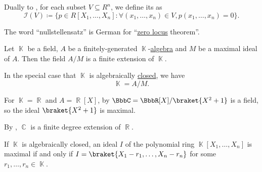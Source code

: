 \begin{definition}\label{def:ideal_of_affine_variety}
  Dually to , for each subset \( V \subseteq R^n \), we define its  as
  \begin{equation*}
    \mathcal{I}(V) \coloneqq \{ p \in R[X_1, \ldots, X_n] \colon \forall (x_1, \ldots, x_n) \in V, p(x_1, \ldots, x_n) = 0 \}.
  \end{equation*}
\end{definition}

\begin{remark}\label{rem:nullstelletsatz_etymology}
  The word \enquote{nullstellensatz} is German for \enquote{\hyperref[def:zero_locus]{zero locus} theorem}.
\end{remark}

\begin{theorem}\label{thm:algebraic_nullstellensatz}
  Let \( \BbbK \) be a field, \( A \) be a finitely-generated \( \BbbK \)-\hyperref[def:algebra_over_ring]{algebra} and \( M \) be a maximal ideal of \( A \). Then the field \( A / M \) is a finite extension of \( \BbbK \).

  In the special case that \( \BbbK \) is algebraically \hyperref[def:algebraically_closed_field]{closed}, we have
  \begin{equation*}
    \BbbK = A / M.
  \end{equation*}
\end{theorem}

\begin{example}\label{ex:algebraic_nullstellensatz_real_over_complex}
  For \( \BbbK = \BbbR \) and \( A = \BbbR[X] \), by  \( \BbbC = \BbbR[X] / \braket{X^2 + 1} \) is a field, so the ideal \( \braket{X^2 + 1} \) is maximal.

  By , \( \BbbC \) is a finite degree extension of \( \BbbR \).
\end{example}

\begin{corollary}\label{thm:closed_field_maximal_ideal_representation}
  If \( \BbbK \) is algebraically closed, an ideal \( I \) of the polynomial ring \( \BbbK[X_1, \ldots, X_n] \) is maximal if and only if \( I = \braket{X_1 - r_1, \ldots, X_n - r_n} \) for some \( r_1, \ldots, r_n \in \BbbK \).
\end{corollary}

